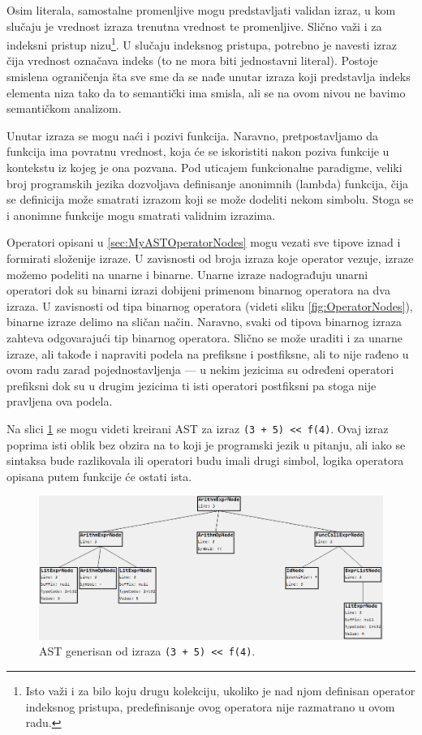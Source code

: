 Osim literala, samostalne promenljive mogu predstavljati validan izraz, u kom slučaju je vrednost izraza trenutna vrednost te promenljive. Slično važi i za indeksni pristup nizu\footnote{Isto važi i za bilo koju drugu kolekciju, ukoliko je nad njom definisan operator indeksnog pristupa, predefinisanje ovog operatora nije razmatrano u ovom radu.}. U slučaju indeksnog pristupa, potrebno je navesti izraz čija vrednost označava indeks (to ne mora biti jednostavni literal). Postoje smislena ograničenja šta sve sme da se nađe unutar izraza koji predstavlja indeks elementa niza tako da to semantički ima smisla, ali se na ovom nivou ne bavimo semantičkom analizom. 

Unutar izraza se mogu naći i pozivi funkcija. Naravno, pretpostavljamo da funkcija ima povratnu vrednost, koja će se iskoristiti nakon poziva funkcije u kontekstu iz kojeg je ona pozvana. Pod uticajem funkcionalne paradigme, veliki broj programskih jezika dozvoljava definisanje anonimnih (lambda) funkcija, čija se definicija može smatrati izrazom koji se može dodeliti nekom simbolu. Stoga se i anonimne funkcije mogu smatrati validnim izrazima. 

Operatori opisani u \ref{sec:MyASTOperatorNodes} mogu vezati sve tipove iznad i formirati složenije izraze. U zavisnosti od broja izraza koje operator vezuje, izraze možemo podeliti na unarne i binarne. Unarne izraze nadograđuju unarni operatori dok su binarni izrazi dobijeni primenom binarnog operatora na dva izraza. U zavisnosti od tipa binarnog operatora (videti sliku \ref{fig:OperatorNodes}), binarne izraze delimo na sličan način. Naravno, svaki od tipova binarnog izraza zahteva odgovarajući tip binarnog operatora. Slično se može uraditi i za unarne izraze, ali takođe i napraviti podela na prefiksne i postfiksne, ali to nije rađeno u ovom radu zarad pojednostavljenja --- u nekim jezicima su određeni operatori prefiksni dok su u drugim jezicima ti isti operatori postfiksni pa stoga nije pravljena ova podela.

Na slici \ref{fig:MyASTExampleExpressions} se mogu videti kreirani AST za izraz \texttt{(3 + 5) << f(4)}. Ovaj izraz poprima isti oblik bez obzira na to koji je programski jezik u pitanju, ali iako se sintaksa bude razlikovala ili operatori budu imali drugi simbol, logika operatora opisana putem funkcije će ostati ista.

\begin{figure}[h!]
\centering
\includegraphics[scale=0.6]{images/ast_expr.png}
\caption{AST generisan od izraza \texttt{(3 + 5) << f(4)}.}
\label{fig:MyASTExampleExpressions}
\end{figure}
